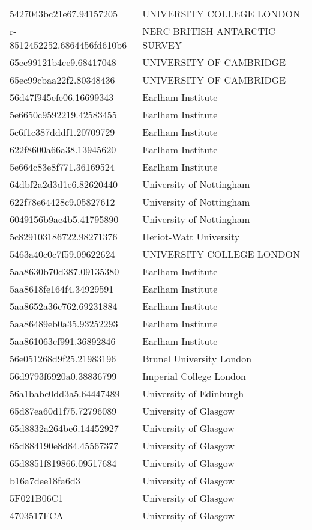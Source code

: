 \begin{tabular}{ll}
5427043bc21e67.94157205 & UNIVERSITY COLLEGE LONDON \\
r-8512452252.6864456fd610b6 & NERC BRITISH ANTARCTIC SURVEY \\
65ec99121b4cc9.68417048 & UNIVERSITY OF CAMBRIDGE \\
65ec99cbaa22f2.80348436 & UNIVERSITY OF CAMBRIDGE \\
56d47f945efe06.16699343 & Earlham Institute \\
5e6650c9592219.42583455 & Earlham Institute \\
5c6f1c387dddf1.20709729 & Earlham Institute \\
622f8600a66a38.13945620 & Earlham Institute \\
5e664c83e8f771.36169524 & Earlham Institute \\
64dbf2a2d3d1e6.82620440 & University of Nottingham \\
622f78e64428c9.05827612 & University of Nottingham \\
6049156b9ae4b5.41795890 & University of Nottingham \\
5c829103186722.98271376 & Heriot-Watt University \\
5463a40c0c7f59.09622624 & UNIVERSITY COLLEGE LONDON \\
5aa8630b70d387.09135380 & Earlham Institute \\
5aa8618fe164f4.34929591 & Earlham Institute \\
5aa8652a36c762.69231884 & Earlham Institute \\
5aa86489eb0a35.93252293 & Earlham Institute \\
5aa861063cf991.36892846 & Earlham Institute \\
56e051268d9f25.21983196 & Brunel University London \\
56d9793f6920a0.38836799 & Imperial College London \\
56a1babc0dd3a5.64447489 & University of Edinburgh \\
65d87ea60d1f75.72796089 & University of Glasgow \\
65d8832a264be6.14452927 & University of Glasgow \\
65d884190e8d84.45567377 & University of Glasgow \\
65d8851f819866.09517684 & University of Glasgow \\
b16a7dee18fa6d3 & University of Glasgow \\
5F021B06C1 & University of Glasgow \\
4703517FCA & University of Glasgow \\

\end{tabular}
